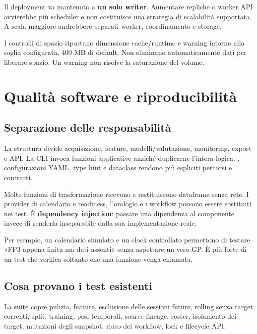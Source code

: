 \documentclass[11pt,a4paper]{article}
\newcommand{\code}[1]{{\ttfamily\small\seqsplit{#1}}}
\begin{document}
Il deployment va mantenuto a \textbf{un solo writer}. Aumentare repliche o worker API avvierebbe più scheduler e non costituisce una strategia di scalabilità supportata. A scala maggiore andrebbero separati worker, coordinamento e storage.

I controlli di spazio riportano dimensione cache/runtime e warning intorno alla soglia configurata, 400 MB di default. Non eliminano automaticamente dati per liberare spazio. Un warning non risolve la saturazione del volume.

\section{Qualità software e riproducibilità}\label{qualituxe0-software-e-riproducibilituxe0}

\subsection{Separazione delle responsabilità}\label{separazione-delle-responsabilituxe0}

La struttura divide acquisizione, feature, modelli/valutazione, monitoring, export e API. La CLI invoca funzioni applicative anziché duplicarne l'intera logica. \code{pathlib}, configurazioni YAML, type hint e dataclass rendono più espliciti percorsi e contratti.

Molte funzioni di trasformazione ricevono e restituiscono dataframe senza rete. I provider di calendario e readiness, l'orologio e i workflow possono essere sostituiti nei test. È \textbf{dependency injection}: passare una dipendenza al componente invece di renderla inseparabile dalla sua implementazione reale.

Per esempio, un calendario simulato e un clock controllato permettono di testare «FP3 appena finita ma dati assenti» senza aspettare un vero GP. È più forte di un test che verifica soltanto che una funzione venga chiamata.

\subsection{Cosa provano i test esistenti}\label{cosa-provano-i-test-esistenti}

La suite copre pulizia, feature, esclusione delle sessioni future, rolling senza target correnti, split, training, pesi temporali, source lineage, roster, isolamento dei target, mutazioni degli snapshot, riuso dei workflow, lock e lifecycle API.
\end{document}
